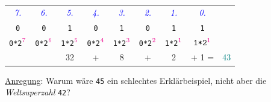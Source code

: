 \begin{frame}[fragile]
\begin{footnotesize}
  \renewcommand{\arraystretch}{1.5}
    \begin{tabular}{c c c c c c c c c}
    \textit{\textcolor{blue}{7.}} &\textit{\textcolor{blue}{6.}} &
      \textit{\textcolor{blue}{5.}} & \textit{\textcolor{blue}{4.}} &
        \textit{\textcolor{blue}{3.}} & \textit{\textcolor{blue}{2.}} &
          \textit{\textcolor{blue}{1.}} & \textit{\textcolor{blue}{0.}} & \\
      \texttt{0} & \texttt{0} & \texttt{1} & \texttt{0} & \texttt{1} & \texttt{0} & \texttt{1} & \texttt{1} & \\
      \texttt{0*2}$\mathcolor{magenta}{^7}$ & \texttt{0*2}$\mathcolor{magenta}{^6}$ & 
        \texttt{1*2}$\mathcolor{magenta}{^5}$ & \texttt{0*2}$\mathcolor{magenta}{^4}$ & 
         \texttt{1*2}$\mathcolor{magenta}{^3}$ & \texttt{0*2}$\mathcolor{magenta}{^2}$ & 
           \texttt{1*2}$\mathcolor{magenta}{^1}$ & $\texttt{1*2}\mathcolor{magenta}{^1}$ & \\
      & & 32 & + & 8 & + & 2 & + 1 = & \textcolor{teal}{43} \\
   \end{tabular}
  \end{footnotesize}

  \vspace{0.5cm}
  \tiny{\underline{Anregung}: Warum wäre \texttt{45} ein schlechtes Erklärbeispiel, nicht aber die \textit{Weltsuperzahl} \texttt{42}?}
\end{frame}


